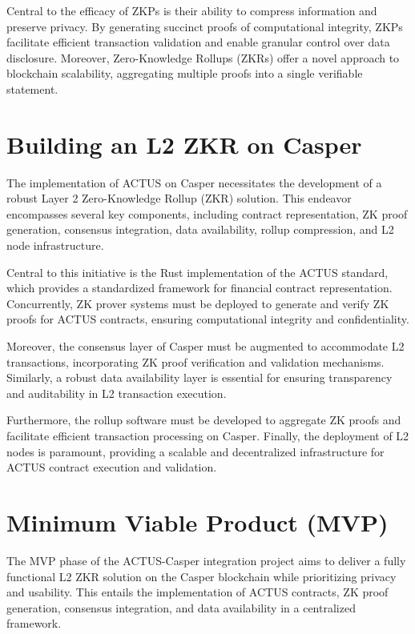 \documentclass[12pt]{article}
\begin{document}
Central to the efficacy of ZKPs is their ability to compress information and
preserve privacy. By generating succinct proofs of computational integrity, ZKPs
facilitate efficient transaction validation and enable granular control over
data disclosure. Moreover, Zero-Knowledge Rollups (ZKRs) offer a novel approach
to blockchain scalability, aggregating multiple proofs into a single verifiable
statement.

\section{Building an L2 ZKR on Casper}

The implementation of ACTUS on Casper necessitates the development of a robust
Layer 2 Zero-Knowledge Rollup (ZKR) solution. This endeavor encompasses several
key components, including contract representation, ZK proof generation,
consensus integration, data availability, rollup compression, and L2 node
infrastructure.

Central to this initiative is the Rust implementation of the ACTUS standard,
which provides a standardized framework for financial contract representation.
Concurrently, ZK prover systems must be deployed to generate and verify ZK
proofs for ACTUS contracts, ensuring computational integrity and
confidentiality.

Moreover, the consensus layer of Casper must be augmented to accommodate L2
transactions, incorporating ZK proof verification and validation mechanisms.
Similarly, a robust data availability layer is essential for ensuring
transparency and auditability in L2 transaction execution.

Furthermore, the rollup software must be developed to aggregate ZK proofs and
facilitate efficient transaction processing on Casper. Finally, the deployment
of L2 nodes is paramount, providing a scalable and decentralized infrastructure
for ACTUS contract execution and validation.

\section{Minimum Viable Product (MVP)}

The MVP phase of the ACTUS-Casper integration project aims to deliver a fully
functional L2 ZKR solution on the Casper blockchain while prioritizing privacy
and usability. This entails the implementation of ACTUS contracts, ZK proof
generation, consensus integration, and data availability in a centralized
framework.
\end{document}
